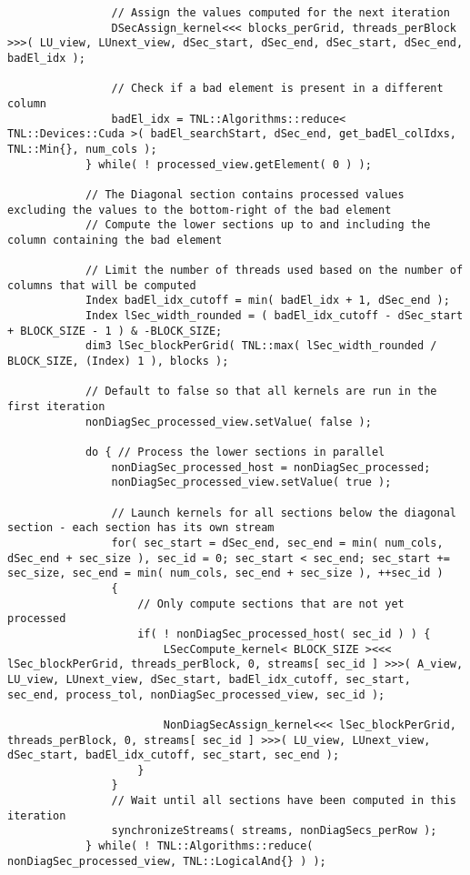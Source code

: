\begin{lstlisting}
				// Assign the values computed for the next iteration
				DSecAssign_kernel<<< blocks_perGrid, threads_perBlock >>>( LU_view, LUnext_view, dSec_start, dSec_end, dSec_start, dSec_end, badEl_idx );
				
				// Check if a bad element is present in a different column
				badEl_idx = TNL::Algorithms::reduce< TNL::Devices::Cuda >( badEl_searchStart, dSec_end, get_badEl_colIdxs, TNL::Min{}, num_cols );
			} while( ! processed_view.getElement( 0 ) );
			
			// The Diagonal section contains processed values excluding the values to the bottom-right of the bad element
			// Compute the lower sections up to and including the column containing the bad element
			
			// Limit the number of threads used based on the number of columns that will be computed
			Index badEl_idx_cutoff = min( badEl_idx + 1, dSec_end );
			Index lSec_width_rounded = ( badEl_idx_cutoff - dSec_start + BLOCK_SIZE - 1 ) & -BLOCK_SIZE;
			dim3 lSec_blockPerGrid( TNL::max( lSec_width_rounded / BLOCK_SIZE, (Index) 1 ), blocks );
			
			// Default to false so that all kernels are run in the first iteration
			nonDiagSec_processed_view.setValue( false );
			
			do { // Process the lower sections in parallel
				nonDiagSec_processed_host = nonDiagSec_processed;
				nonDiagSec_processed_view.setValue( true );
				
				// Launch kernels for all sections below the diagonal section - each section has its own stream
				for( sec_start = dSec_end, sec_end = min( num_cols, dSec_end + sec_size ), sec_id = 0; sec_start < sec_end; sec_start += sec_size, sec_end = min( num_cols, sec_end + sec_size ), ++sec_id )
				{
					// Only compute sections that are not yet processed
					if( ! nonDiagSec_processed_host( sec_id ) ) {
						LSecCompute_kernel< BLOCK_SIZE ><<< lSec_blockPerGrid, threads_perBlock, 0, streams[ sec_id ] >>>( A_view, LU_view, LUnext_view, dSec_start, badEl_idx_cutoff, sec_start, sec_end, process_tol, nonDiagSec_processed_view, sec_id );
						
						NonDiagSecAssign_kernel<<< lSec_blockPerGrid, threads_perBlock, 0, streams[ sec_id ] >>>( LU_view, LUnext_view, dSec_start, badEl_idx_cutoff, sec_start, sec_end );
					}
				}
				// Wait until all sections have been computed in this iteration
				synchronizeStreams( streams, nonDiagSecs_perRow );
			} while( ! TNL::Algorithms::reduce( nonDiagSec_processed_view, TNL::LogicalAnd{} ) );
			

\end{lstlisting}
